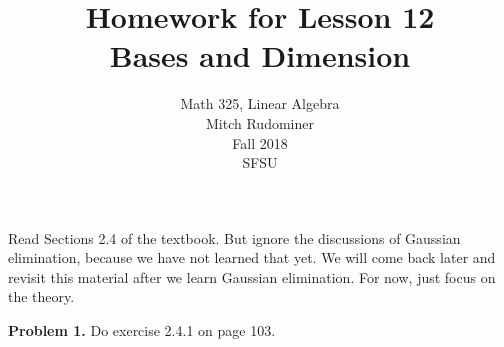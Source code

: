 \documentclass[oneside,12pt]{amsart}
\begin{document}
\title{Homework for Lesson 12 \\ Bases and Dimension}
\author{Math 325, Linear Algebra \\ Mitch Rudominer \\ Fall 2018 \\ SFSU }
\date{}

\maketitle

Read Sections 2.4 of the textbook. But ignore the discussions of
Gaussian elimination, because we have not learned that yet. We will come
back later and revisit this material after we learn Gaussian elimination.
For now, just focus on the theory.

\bigskip

\textbf{Problem 1.} Do exercise 2.4.1 on page 103.
\end{document}

